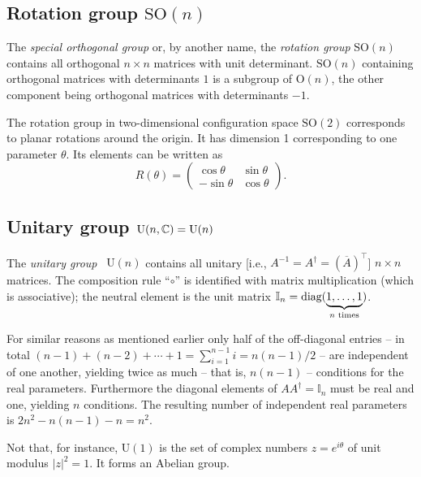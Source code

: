\subsection{Rotation group $\textrm{SO}(n)$}

The {\em special orthogonal group} or, by another name, the {\em rotation group} $\textrm{SO}(n)$
contains all  orthogonal
$n\times n$ matrices with unit determinant.
$\textrm{SO}(n)$ containing orthogonal matrices with determinants $1$ is a subgroup of $\textrm{O}(n)$,
the other component being orthogonal matrices with determinants $-1$.

The rotation group in two-dimensional configuration space  $\textrm{SO}(2)$
corresponds to planar rotations around the origin. It has dimension 1 corresponding to one parameter $\theta$.
Its elements can be written as
\begin{equation}
R(\theta )  =
\begin{pmatrix}
\cos \theta & \sin \theta\\
- \sin \theta  & \cos \theta
\end{pmatrix}
.
\end{equation}




\subsection{Unitary group  $\textrm{U}(n,{\Bbb C}) = \textrm{U}(n)$}

The {\em unitary group}~\cite{murnaghan} $\textrm{U}(n)$
contains all  unitary [i.e., $  A  ^{-1}=  A  ^\dagger =(\overline{  A  })^\intercal $]
$n\times n$ matrices.
The composition rule ``$\circ$''
is identified with matrix multiplication (which is associative); the neutral element is the unit
matrix ${\Bbb I}_n=\textrm{diag}(\underbrace{1,\ldots ,1}_{n \textrm{ times}})$.

For similar reasons as mentioned earlier only half of the off-diagonal entries
-- in total $(n-1) + (n-2)+  \cdots +1= \sum_{i=1}^{n-1} i= n(n-1)/2$ --
are independent of one another, yielding twice as much -- that is, $n(n-1)$ --
conditions for the real parameters.
Furthermore
the diagonal elements of
$  A  A  ^\dagger = {\mathbb {I}}_n$
must be real and one, yielding $n$ conditions.
The resulting number of independent real parameters is $2 n^2 - n(n-1) - n =n^2$.

Not that, for instance,
$\textrm{U}(1)$ is the set of complex numbers $z=e^{i\theta}$ of unit modulus  $|z|^2=1$. It forms an Abelian group.

